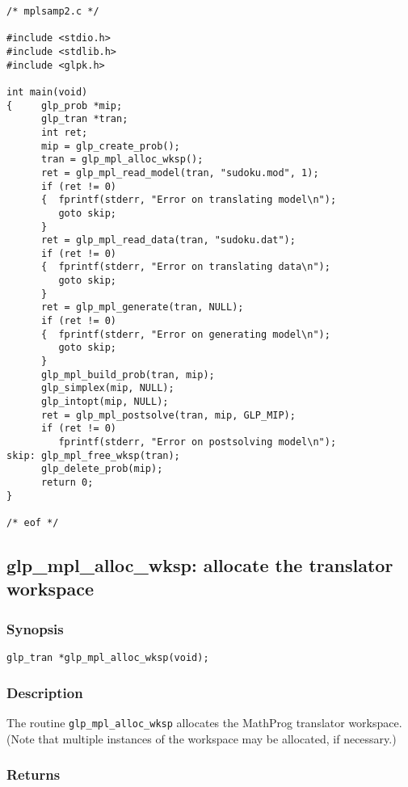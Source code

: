 \begin{small}
\begin{verbatim}
/* mplsamp2.c */

#include <stdio.h>
#include <stdlib.h>
#include <glpk.h>

int main(void)
{     glp_prob *mip;
      glp_tran *tran;
      int ret;
      mip = glp_create_prob();
      tran = glp_mpl_alloc_wksp();
      ret = glp_mpl_read_model(tran, "sudoku.mod", 1);
      if (ret != 0)
      {  fprintf(stderr, "Error on translating model\n");
         goto skip;
      }
      ret = glp_mpl_read_data(tran, "sudoku.dat");
      if (ret != 0)
      {  fprintf(stderr, "Error on translating data\n");
         goto skip;
      }
      ret = glp_mpl_generate(tran, NULL);
      if (ret != 0)
      {  fprintf(stderr, "Error on generating model\n");
         goto skip;
      }
      glp_mpl_build_prob(tran, mip);
      glp_simplex(mip, NULL);
      glp_intopt(mip, NULL);
      ret = glp_mpl_postsolve(tran, mip, GLP_MIP);
      if (ret != 0)
         fprintf(stderr, "Error on postsolving model\n");
skip: glp_mpl_free_wksp(tran);
      glp_delete_prob(mip);
      return 0;
}

/* eof */
\end{verbatim}
\end{small}

\subsection{glp\_mpl\_alloc\_wksp: allocate the translator workspace}

\subsubsection*{Synopsis}

\begin{verbatim}
glp_tran *glp_mpl_alloc_wksp(void);
\end{verbatim}

\subsubsection*{Description}

The routine \verb|glp_mpl_alloc_wksp| allocates the MathProg translator
work\-space. (Note that multiple instances of the workspace may be
allocated, if necessary.)

\subsubsection*{Returns}

